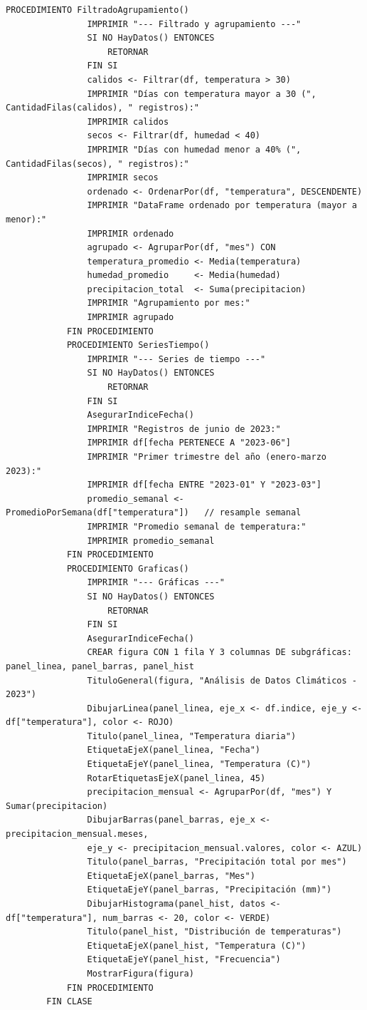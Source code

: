 \documentclass{assignment}
\begin{document}
\begin{lstlisting}[caption={Clase Clima}, label={lst:clima}]
			PROCEDIMIENTO FiltradoAgrupamiento()
				IMPRIMIR "--- Filtrado y agrupamiento ---"
				SI NO HayDatos() ENTONCES
					RETORNAR
				FIN SI
				calidos <- Filtrar(df, temperatura > 30)
				IMPRIMIR "Días con temperatura mayor a 30 (", CantidadFilas(calidos), " registros):"
				IMPRIMIR calidos
				secos <- Filtrar(df, humedad < 40)
				IMPRIMIR "Días con humedad menor a 40% (", CantidadFilas(secos), " registros):"
				IMPRIMIR secos
				ordenado <- OrdenarPor(df, "temperatura", DESCENDENTE)
				IMPRIMIR "DataFrame ordenado por temperatura (mayor a menor):"
				IMPRIMIR ordenado
				agrupado <- AgruparPor(df, "mes") CON
				temperatura_promedio <- Media(temperatura)
				humedad_promedio     <- Media(humedad)
				precipitacion_total  <- Suma(precipitacion)
				IMPRIMIR "Agrupamiento por mes:"
				IMPRIMIR agrupado
			FIN PROCEDIMIENTO
			PROCEDIMIENTO SeriesTiempo()
				IMPRIMIR "--- Series de tiempo ---"
				SI NO HayDatos() ENTONCES
					RETORNAR
				FIN SI
				AsegurarIndiceFecha()
				IMPRIMIR "Registros de junio de 2023:"
				IMPRIMIR df[fecha PERTENECE A "2023-06"]		
				IMPRIMIR "Primer trimestre del año (enero-marzo 2023):"
				IMPRIMIR df[fecha ENTRE "2023-01" Y "2023-03"]		
				promedio_semanal <- PromedioPorSemana(df["temperatura"])   // resample semanal
				IMPRIMIR "Promedio semanal de temperatura:"
				IMPRIMIR promedio_semanal
			FIN PROCEDIMIENTO
			PROCEDIMIENTO Graficas()
				IMPRIMIR "--- Gráficas ---"
				SI NO HayDatos() ENTONCES
					RETORNAR
				FIN SI
				AsegurarIndiceFecha()
				CREAR figura CON 1 fila Y 3 columnas DE subgráficas: panel_linea, panel_barras, panel_hist
				TituloGeneral(figura, "Análisis de Datos Climáticos - 2023")
				DibujarLinea(panel_linea, eje_x <- df.indice, eje_y <- df["temperatura"], color <- ROJO)
				Titulo(panel_linea, "Temperatura diaria")
				EtiquetaEjeX(panel_linea, "Fecha")
				EtiquetaEjeY(panel_linea, "Temperatura (C)")
				RotarEtiquetasEjeX(panel_linea, 45)
				precipitacion_mensual <- AgruparPor(df, "mes") Y Sumar(precipitacion)
				DibujarBarras(panel_barras, eje_x <- precipitacion_mensual.meses,
				eje_y <- precipitacion_mensual.valores, color <- AZUL)
				Titulo(panel_barras, "Precipitación total por mes")
				EtiquetaEjeX(panel_barras, "Mes")
				EtiquetaEjeY(panel_barras, "Precipitación (mm)")
				DibujarHistograma(panel_hist, datos <- df["temperatura"], num_barras <- 20, color <- VERDE)
				Titulo(panel_hist, "Distribución de temperaturas")
				EtiquetaEjeX(panel_hist, "Temperatura (C)")
				EtiquetaEjeY(panel_hist, "Frecuencia")
				MostrarFigura(figura)
			FIN PROCEDIMIENTO
		FIN CLASE
	\end{lstlisting}
\end{document}
